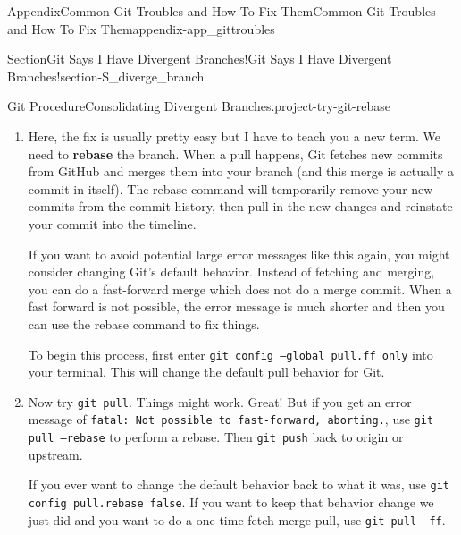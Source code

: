 \documentclass[oneside,10pt,]{book}
\newcommand{\mono}[1]{\texttt{#1}}
\newcommand{\terminology}[1]{\textbf{#1}}
\begin{document}
\begin{appendixptx}{Appendix}{Common Git Troubles and How To Fix Them}{}{Common Git Troubles and How To Fix Them}{}{}{appendix-app_gittroubles}
\begin{sectionptx}{Section}{Git Says I Have Divergent Branches!}{}{Git Says I Have Divergent Branches!}{}{}{section-S_diverge_branch}
\begin{project}{Git Procedure}{Consolidating Divergent Branches.}{project-try-git-rebase}
\begin{enumerate}[font=\bfseries,label=(\alph*),ref=\alph*]
\begin{console}{0}{1}{0}
From <repo-you-are-pushing-to>
   2417195..8b492ee  main       -> origin/main
hint: You have divergent branches and need to specify how to reconcile them.
hint: You can do so by running one of the following commands sometime before
hint: your next pull:
hint: 
hint:   git config pull.rebase false  # merge
hint:   git config pull.rebase true   # rebase
hint:   git config pull.ff only       # fast-forward only
hint: 
hint: You can replace "git config" with "git config --global" to set a default
hint: preference for all repositories. You can also pass --rebase, --no-rebase,
hint: or --ff-only on the command line to override the configured default per
hint: invocation.
fatal: Need to specify how to reconcile divergent branches.
\end{console}
which is quite overwhelming.%
\item{}Here, the fix is usually pretty easy but I have to teach you a new term. We need to \terminology{rebase} the branch. When a pull happens, Git fetches new commits from GitHub and merges them into your branch (and this merge is actually a commit in itself). The rebase command will temporarily remove your new commits from the commit history, then pull in the new changes and reinstate your commit into the timeline.%
\par
If you want to avoid potential large error messages like this again, you might consider changing Git's default behavior. Instead of fetching and merging, you can do a fast-forward merge which does not do a merge commit. When a fast forward is not possible, the error message is much shorter and then you can use the rebase command to fix things.%
\par
To begin this process, first enter \mono{git config --global pull.ff only} into your terminal. This will change the default pull behavior for Git.%
\item{}Now try \mono{git pull}. Things might work. Great! But if you get an error message of \mono{fatal: Not possible to fast-forward, aborting.}, use \mono{git pull --rebase} to perform a rebase. Then \mono{git push} back to origin or upstream.%
\par
If you ever want to change the default behavior back to what it was, use \mono{git config pull.rebase false}. If you want to keep that behavior change we just did and you want to do a one-time fetch-merge pull, use \mono{git pull --ff}.%
\end{enumerate}%
\end{project}%
\end{sectionptx}

\end{appendixptx}
\end{document}
